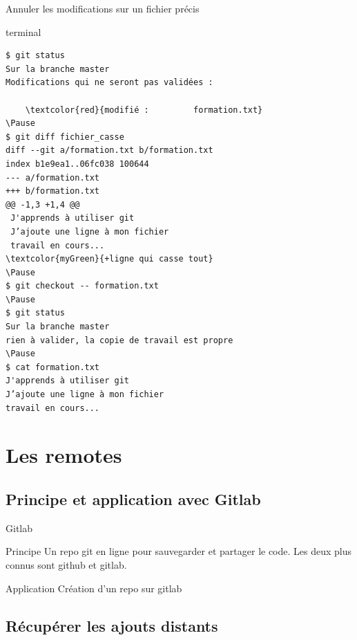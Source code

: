\documentclass[usepdftitle=false]{beamer}
\newcommand{\Pause}{%
\ifdef{\Release}
  {\pause}
  {}
}
\begin{document}
\begin{frame}[fragile]{Annuler les modifications sur un fichier précis}
	\begin{beamercolorbox}[rounded=true,shadow=true]{terminal}
\begin{Verbatim}
$ git status
Sur la branche master
Modifications qui ne seront pas validées :

	\textcolor{red}{modifié :         formation.txt}
\Pause
$ git diff fichier_casse
diff --git a/formation.txt b/formation.txt
index b1e9ea1..06fc038 100644
--- a/formation.txt
+++ b/formation.txt
@@ -1,3 +1,4 @@
 J'apprends à utiliser git
 J’ajoute une ligne à mon fichier
 travail en cours...
\textcolor{myGreen}{+ligne qui casse tout}
\Pause
$ git checkout -- formation.txt
\Pause
$ git status
Sur la branche master
rien à valider, la copie de travail est propre
\Pause
$ cat formation.txt
J'apprends à utiliser git
J’ajoute une ligne à mon fichier
travail en cours...
\end{Verbatim}
	\end{beamercolorbox}
\end{frame}

\section{Les remotes}

\subsection{Principe et application avec Gitlab}

\begin{frame}{Gitlab}
	\begin{block}{Principe}
		Un repo git en ligne pour sauvegarder et partager le code. Les deux plus connus sont github et gitlab.
	\end{block}
	\begin{block}{Application}
		Création d'un repo sur gitlab
	\end{block}
\end{frame}

\subsection{Récupérer les ajouts distants}
\end{document}
